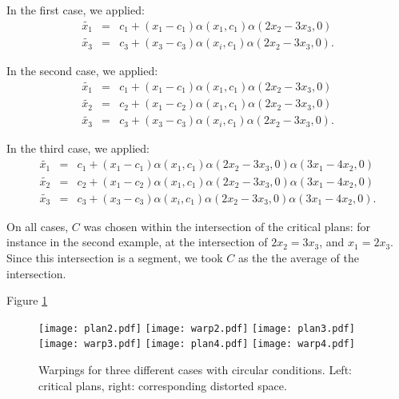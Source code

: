 \documentclass[a4paper,10pt]{article}
\begin{document}
In the first case, we applied:
\begin{eqnarray*}
 \widetilde{x_1} &=& c_1 + \left( x_1 - c_1\right) \alpha(x_1, c_1) \alpha(2 x_2 - 3 x_3, 0) \\
 \widetilde{x_3} &=& c_3 + \left( x_3 - c_3\right) \alpha(x_i, c_1) \alpha(2 x_2 - 3 x_3, 0).
\end{eqnarray*}

In the second case, we applied:
\begin{eqnarray*}
 \widetilde{x_1} &=& c_1 + \left( x_1 - c_1\right) \alpha(x_1, c_1) \alpha(2 x_2 - 3 x_3, 0) \\
 \widetilde{x_2} &=& c_2 + \left( x_1 - c_2\right) \alpha(x_1, c_1) \alpha(2 x_2 - 3 x_3, 0) \\
 \widetilde{x_3} &=& c_3 + \left( x_3 - c_3\right) \alpha(x_i, c_1) \alpha(2 x_2 - 3 x_3, 0).
\end{eqnarray*}

In the third case, we applied:
\begin{eqnarray*}
 \widetilde{x_1} &=& c_1 + \left( x_1 - c_1\right) \alpha(x_1, c_1) \alpha(2 x_2 - 3 x_3, 0) \alpha(3 x_1 - 4 x_2, 0) \\
 \widetilde{x_2} &=& c_2 + \left( x_1 - c_2\right) \alpha(x_1, c_1) \alpha(2 x_2 - 3 x_3, 0) \alpha(3 x_1 - 4 x_2, 0) \\
 \widetilde{x_3} &=& c_3 + \left( x_3 - c_3\right) \alpha(x_i, c_1) \alpha(2 x_2 - 3 x_3, 0) \alpha(3 x_1 - 4 x_2, 0).
\end{eqnarray*}

On all cases, $C$ was chosen within the intersection of the critical plans: for instance in the second example,
at the intersection of $2 x_2=3 x_3$, and  $x_1=2 x_3$. Since this intersection is a segment, we took $C$ as the 
the average of the intersection.

Figure \ref{fig:3cases}

\begin{figure}[!ht]
 \centering
 \texttt{[image: plan2.pdf]}
 \texttt{[image: warp2.pdf]}
  \texttt{[image: plan3.pdf]}
 \texttt{[image: warp3.pdf]}
  \texttt{[image: plan4.pdf]}
 \texttt{[image: warp4.pdf]}
 \caption{Warpings for three different cases with circular conditions. Left: critical plans, right: corresponding distorted space.}\label{fig:3cases}
\end{figure}
\end{document}
